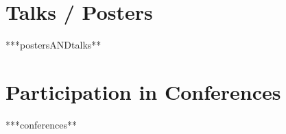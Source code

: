 \documentclass[10pt]{article}
\makeatletter
\renewcommand{\labelenumi}{\@biblabel{A\theenumi}} %
\makeatother
\begin{document}





\let\originalbibitem\bibitem
\def\bibitem#1#2\par{%
  \noexpandarg
  \originalbibitem{#1}
  \par}

\nocite{*}

\renewcommand\refname{Publications}

% 



\section{Talks / Posters}
\begin{enumerate}
\renewcommand{\labelenumi}{[P\arabic{enumi}] }

  ***postersANDtalks**

\end{enumerate}


\section{Participation in Conferences}
\begin{itemize}

  ***conferences**

\end{itemize}
\end{document}
